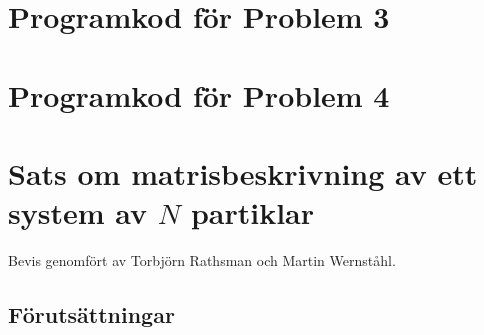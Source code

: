 \documentclass[12pt,a4paper]{article}
\begin{document}
	\begin{appendix}
	
		
		
		\section{Programkod för Problem 3}
			
			\begin{framed}
				
			\end{framed}
		
		\newpage
		
		\section{Programkod för Problem 4}
			
			\begin{framed}
				
			\end{framed}
	
	\newpage
	
\section{Sats om matrisbeskrivning av ett system av $N$ partiklar}
	
	\setcounter{equation}{0}
	
	Bevis genomfört av Torbjörn Rathsman och Martin Wernståhl.
	
	\subsection{Förutsättningar}
		\label{assumptions}
		

\end{appendix}
\end{document}
